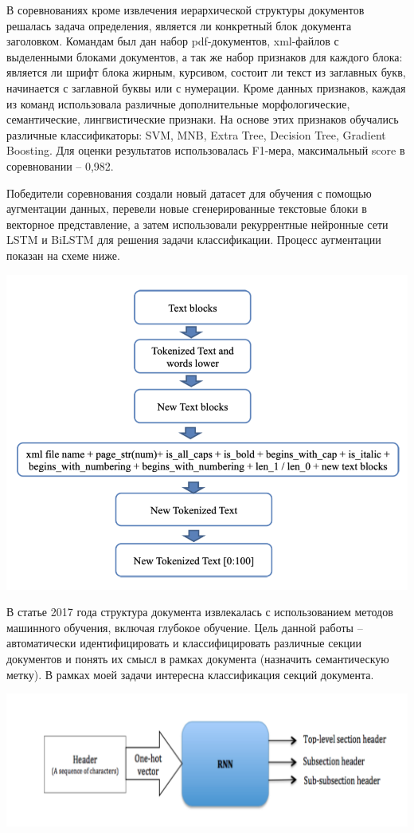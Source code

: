 \documentclass[a4paper,12pt]{article}
\begin{document}
В соревнованиях \cite{link4} кроме извлечения иерархической структуры документов решалась задача определения, является ли конкретный блок документа заголовком. Командам был дан набор pdf-документов, xml-файлов с выделенными блоками документов, а так же набор признаков для каждого блока: является ли шрифт блока жирным, курсивом, состоит ли текст из заглавных букв, начинается с заглавной буквы или с нумерации. Кроме данных признаков, каждая из команд использовала различные дополнительные морфологические, семантические, лингвистические признаки. На основе этих признаков обучались различные классификаторы: SVM, MNB, Extra Tree, Decision Tree, Gradient Boosting. Для оценки результатов использовалась F1-мера, максимальный score в соревновании -- 0,982.

Победители соревнования \cite{link6} создали новый датасет для обучения с помощью аугментации данных, перевели новые сгенерированные текстовые блоки в векторное представление, а затем использовали рекуррентные нейронные сети LSTM и BiLSTM для решения задачи классификации. Процесс аугментации показан на схеме ниже.

\begin{center}
\includegraphics[height=0.5\textwidth]{pics/augmentation.png}
\end{center}

В статье \cite{link7} 2017 года структура документа извлекалась с использованием методов машинного обучения, включая глубокое обучение. Цель данной работы -- автоматически идентифицировать и классифицировать различные секции документов и понять их смысл в рамках документа (назначить семантическую метку). В рамках моей задачи интересна классификация секций документа.

\begin{center}
\includegraphics[width=1.0\textwidth]{pics/classifier.png}
\end{center}
\end{document}
